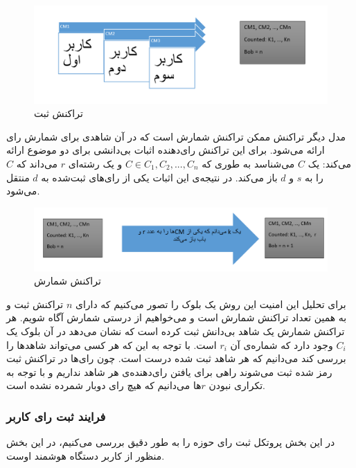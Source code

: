\begin{figure}[h!]
	\centering
	\includegraphics[width=1\linewidth]{commit.PNG}
	\caption {تراکنش ثبت}
	\label{fig:commit}
\end{figure}

\par
مدل دیگر تراکنش ممکن تراکنش شمارش است که در آن شاهدی برای شمارش رای ارائه می‌شود. برای این تراکنش رای‌دهنده اثبات بی‌دانشی برای دو موضوع ارائه می‌کند: یک $C$ می‌شناسد به طوری که  $C \in C_1, C_2, ... ,C_n$ و یک رشته‌ای $r$ می‌داند که $C$ را به $s$ و $d$ باز می‌کند. در نتیجه‌ی این اثبات یکی از رای‌های ثبت‌شده به $d$ منتقل می‌شود. 

\begin{figure}[t]
	\centering
	\includegraphics[width=1\linewidth]{Count.PNG}
	\caption {تراکنش شمارش}
	\label{fig:count}
	\end{figure}
\par
برای تحلیل این امنیت این روش یک بلوک را تصور می‌کنیم که دارای $n$ تراکنش ثبت و به همین تعداد تراکنش شمارش است و می‌خواهیم از درستی شمارش آگاه شویم. هر تراکنش شمارش یک شاهد بی‌دانش ثبت کرده است که نشان می‌دهد در آن بلوک یک $C_i$ وجود دارد که شماره‌ی آن $r_i$ است. با توجه به این که هر کسی می‌تواند شاهد‌ها را بررسی کند می‌دانیم که هر شاهد ثبت شده درست است. چون رای‌‌ها در تراکنش ثبت رمز شده ثبت می‌شوند راهی برای یافتن رای‌دهنده‌ی هر شاهد نداریم و با توجه به تکراری نبودن $r$ها می‌دانیم که هیچ رای دوبار شمرده نشده است. 

\subsubsection{فرایند ثبت رای کاربر}
در این بخش پروتکل ثبت رای حوزه را به طور دقیق بررسی می‌کنیم، در این بخش منظور از کاربر دستگاه هوشمند اوست. 


